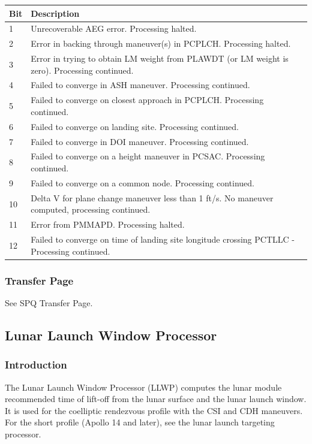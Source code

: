 \documentclass[11pt]{article} %
\begin{document}
\begin{center}
\begin{tabular}{ | l | m{12cm} |}
\hline
Bit&Description\\
\hline
1&Unrecoverable AEG error. Processing halted.\\
\hline
2&Error in backing through maneuver(s) in PCPLCH. Processing halted.\\
\hline
3&Error in trying to obtain LM weight from PLAWDT (or LM weight is zero). Processing continued.\\
\hline
4&Failed to converge in ASH maneuver. Processing continued.\\
\hline
5&Failed to converge on closest approach in PCPLCH. Processing continued.\\
\hline
6&Failed to converge on landing site. Processing continued.\\
\hline
7&Failed to converge in DOI maneuver. Processing continued.\\
\hline
8&Failed to converge on a height maneuver in PCSAC. Processing continued.\\
\hline
9&Failed to converge on a common node. Processing continued.\\
\hline
10&Delta V for plane change maneuver less than 1 ft/s. No maneuver computed, processing continued.\\
\hline
11&Error from PMMAPD. Processing halted.\\
\hline
12&Failed to converge on time of landing site longitude crossing PCTLLC - Processing continued.\\
\hline
\end{tabular}
\end{center}
\newpage
\subsubsection{Transfer Page}
See SPQ Transfer Page.
\newpage
\subsection{Lunar Launch Window Processor}
\subsubsection{Introduction}
The Lunar Launch Window Processor (LLWP) computes the lunar module recommended time of lift-off from the lunar surface and the lunar launch window. It is used for the coelliptic rendezvous profile with the CSI and CDH maneuvers. For the short profile (Apollo 14 and later), see the lunar launch targeting processor.\\
\end{document}
